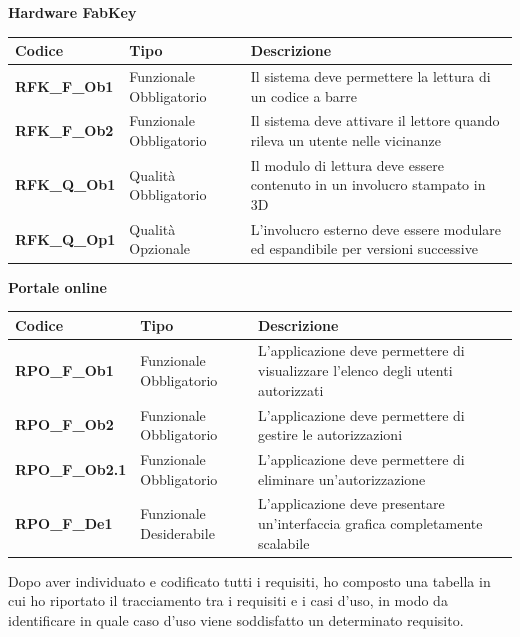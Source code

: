 \textbf{Hardware FabKey}
\renewcommand{\arraystretch}{2.0}
\begin{longtable}{|l|p{2.5cm}|p{8cm}|}
\hline
\textbf{Codice} & \textbf{Tipo} & \textbf{Descrizione} \\ 
\hline
\textbf{RFK\_F\_Ob1} & Funzionale \linebreak Obbligatorio & Il sistema deve permettere la lettura di un codice a barre \\ 
\hline
\textbf{RFK\_F\_Ob2} & Funzionale \linebreak Obbligatorio & Il sistema deve attivare il lettore quando rileva un utente nelle vicinanze \\
\hline
\textbf{RFK\_Q\_Ob1} & Qualità \linebreak Obbligatorio & Il modulo di lettura deve essere contenuto in un involucro stampato in 3D \\
\hline
\textbf{RFK\_Q\_Op1} & Qualità \linebreak Opzionale & L'involucro esterno deve essere modulare ed espandibile per versioni successive \\
\hline
\end{longtable}


\medskip

\textbf{Portale online}
\renewcommand{\arraystretch}{2.0}
\begin{longtable}{|l|p{2.5cm}|p{8cm}|}
\hline
\textbf{Codice} & \textbf{Tipo} & \textbf{Descrizione} \\ 
\hline
\textbf{RPO\_F\_Ob1} & Funzionale \linebreak Obbligatorio & L'applicazione deve permettere di visualizzare l'elenco degli utenti autorizzati \\ 
\hline
\textbf{RPO\_F\_Ob2} & Funzionale \linebreak Obbligatorio & L'applicazione deve permettere di gestire le autorizzazioni \\
\hline
\textbf{RPO\_F\_Ob2.1} & Funzionale \linebreak Obbligatorio & L'applicazione deve permettere di eliminare un'autorizzazione \\
\hline
\textbf{RPO\_F\_De1} & Funzionale \linebreak Desiderabile & L'applicazione deve presentare un'interfaccia grafica completamente scalabile \\
\hline
\end{longtable}


Dopo aver individuato e codificato tutti i requisiti, ho composto una tabella in cui ho riportato il tracciamento tra i requisiti e i casi d'uso, in modo da identificare in quale caso d'uso viene soddisfatto un determinato requisito.

